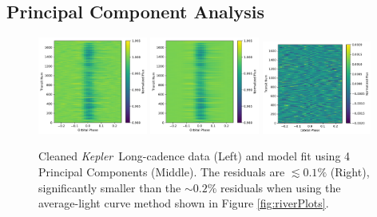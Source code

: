 \documentclass[preprint,trackchanges]{aastex61}
\newcommand{\kepler}{{\it Kepler}}
\begin{document}
\subsection{Principal Component Analysis}
\begin{figure}[!hbtp]
\begin{centering}
\includegraphics[width=0.32\textwidth]{photometry_riverplot.pdf}
\includegraphics[width=0.32\textwidth]{pca_model_2D.pdf}
\includegraphics[width=0.32\textwidth]{pca_resid_2D.pdf}
\caption{Cleaned \kepler\ Long-cadence data (Left) and model fit using 4 Principal Components (Middle).
The residuals are $\lesssim 0.1\%$ (Right), significantly smaller than the $\sim 0.2\%$ residuals when using the average-light curve method shown in Figure \ref{fig:riverPlots}.
}\label{fig:riverPlotsPCA}
\end{centering}
\end{figure}
\end{document}

